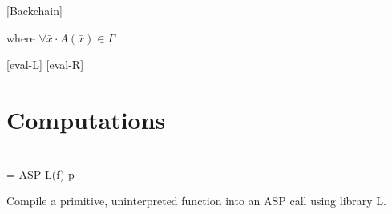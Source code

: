 \documentclass[runningheads]{llncs}
\theoremstyle{definition}
\begin{document}
[Backchain]

where $\forall \bar{x}\cdot A(\bar{x})\in\Gamma$

\begin{definition}[Backchain]

\end{definition}

[eval-L]
[eval-R]

\begin{definition}[Eval]
  
\end{definition}

\section{Computations}

\begin{definition}\\
 = ASP L(f) p
\end{definition}

Compile a primitive, uninterpreted function into an ASP call using
library L.

%
% 
%
%
%

%

%
\end{document}
